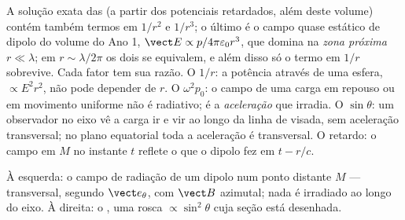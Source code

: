 \begin{remark}\label{rem:b2:dipole-radiation:reading}
A solução exata das  (a partir dos potenciais
retardados, além deste volume) contém também termos em $1/r^2$ e
$1/r^3$; o último é o campo quase estático de dipolo do volume do Ano 1,
$\vect E \propto p/4\pi\varepsilon_0r^3$, que domina na \emph{zona
próxima} $r \ll \lambda$; em $r \sim \lambda/2\pi$ os dois se equivalem, e além disso
só o termo em $1/r$ sobrevive. Cada fator tem sua razão. O $1/r$: a
potência através de uma esfera, $\propto E^2r^2$, não pode depender de $r$. O $\omega^2p_0$:
o campo de uma carga em repouso ou em movimento uniforme não é radiativo; é
a \emph{aceleração} que irradia. O $\sin\theta$: um observador no
eixo vê a carga ir e vir ao longo da linha de visada, sem
aceleração transversal; no plano equatorial toda a
aceleração é transversal. O retardo: o campo em $M$ no instante $t$
reflete o que o dipolo fez em $t - r/c$.
\end{remark}

\begin{omfigure}

{\small À esquerda: o campo de radiação de um dipolo num ponto distante $M$ ---
transversal, segundo $\vect e_\theta$, com $\vect B$ azimutal; nada é
irradiado ao longo do eixo. À direita: o , uma rosca
$\propto\sin^2\theta$ cuja seção está desenhada.}
\end{omfigure}


